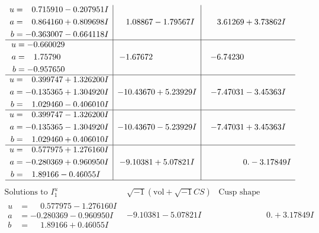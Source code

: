 \documentclass[1p]{elsarticle_modified}
\theoremstyle{definition}
\newcommand{\I}{\sqrt{-1}}
\begin{document}
$$\begin{array}{c|c|c}
\begin{aligned}
u &= \phantom{-}0.715910 - 0.207951 I \\
a &= \phantom{-}0.864160 + 0.809698 I \\
b &= -0.363007 - 0.664118 I\end{aligned}
 & \phantom{-}1.08867 - 1.79567 I & \phantom{-}3.61269 + 3.73862 I \\ \hline\begin{aligned}
u &= -0.660029\phantom{ +0.000000I} \\
a &= \phantom{-}1.75790\phantom{ +0.000000I} \\
b &= -0.957650\phantom{ +0.000000I}\end{aligned}
 & -1.67672\phantom{ +0.000000I} & -6.74230\phantom{ +0.000000I} \\ \hline\begin{aligned}
u &= \phantom{-}0.399747 + 1.326200 I \\
a &= -0.135365 + 1.304920 I \\
b &= \phantom{-}1.029460 - 0.406010 I\end{aligned}
 & -10.43670 + 5.23929 I & -7.47031 - 3.45363 I \\ \hline\begin{aligned}
u &= \phantom{-}0.399747 - 1.326200 I \\
a &= -0.135365 - 1.304920 I \\
b &= \phantom{-}1.029460 + 0.406010 I\end{aligned}
 & -10.43670 - 5.23929 I & -7.47031 + 3.45363 I \\ \hline\begin{aligned}
u &= \phantom{-}0.577975 + 1.276160 I \\
a &= -0.280369 + 0.960950 I \\
b &= \phantom{-}1.89166 - 0.46055 I\end{aligned}
 & -9.10381 + 5.07821 I & \phantom{-0.000000 } 0. - 3.17849 I\\
 \hline 
 \end{array}$$\newpage$$\begin{array}{c|c|c}  
\text{Solutions to }I^u_{1}& \I (\text{vol} + \sqrt{-1}CS) & \text{Cusp shape}\\
 \hline 
\begin{aligned}
u &= \phantom{-}0.577975 - 1.276160 I \\
a &= -0.280369 - 0.960950 I \\
b &= \phantom{-}1.89166 + 0.46055 I\end{aligned}
 & -9.10381 - 5.07821 I & \phantom{-0.000000 -}0. + 3.17849 I \\ \hline\begin{aligned}

\end{aligned}
\end{array}$$
\end{document}
